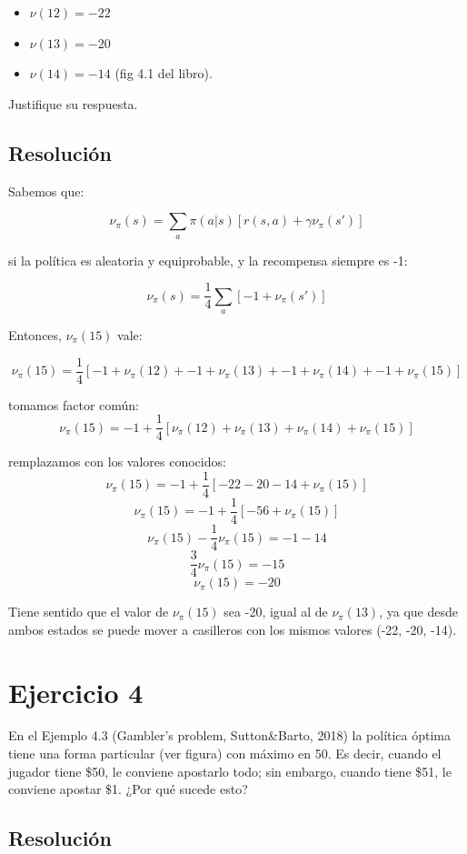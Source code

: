 \documentclass[12pt,a4paper]{article}
\begin{document}
\begin{itemize}

\item $\nu(12) = -22$
\item $\nu(13) = -20$
\item $\nu(14) = -14$ (fig 4.1 del libro).
\end{itemize}

Justifique su respuesta.

\subsection{Resolución}

Sabemos que:

$$ \nu_\pi(s) = \sum_a \pi(a|s) [r(s,a) + \gamma \nu_\pi(s')] $$

si la política es aleatoria y equiprobable, y la recompensa siempre es -1:

$$ \nu_\pi(s) = \frac{1}{4} \sum_a [-1 + \nu_\pi(s')] $$

Entonces, $\nu_\pi(15)$ vale:

$$ \nu_\pi(15) = \frac{1}{4} [ -1 + \nu_\pi(12) + -1 + \nu_\pi(13) + -1 + \nu_\pi(14) + -1 + \nu_\pi(15)] $$

tomamos factor común:
$$ \nu_\pi(15) = -1 + \frac{1}{4} [\nu_\pi(12) + \nu_\pi(13) + \nu_\pi(14) + \nu_\pi(15)] $$

remplazamos con los valores conocidos:
$$ \nu_\pi(15) = -1 + \frac{1}{4} [-22 - 20 - 14 + \nu_\pi(15)] $$
$$ \nu_\pi(15) = -1 + \frac{1}{4} [-56 + \nu_\pi(15)] $$
$$ \nu_\pi(15) - \frac{1}{4}\nu_\pi(15) = -1 - 14 $$
$$ \frac{3}{4}\nu_\pi(15) = -15 $$
$$ \nu_\pi(15) = -20 $$

Tiene sentido que el valor de $\nu_\pi(15)$ sea -20, igual al de
$\nu_\pi(13)$, ya que desde ambos estados se puede mover a
casilleros con los mismos valores (-22, -20, -14).

\section{Ejercicio 4}

En el Ejemplo 4.3 (Gambler's problem, Sutton\&Barto, 2018) la política óptima tiene una forma particular 
(ver figura) con máximo en 50. Es decir,  cuando  el  jugador  tiene \$50,  le  conviene apostarlo todo; 
sin embargo, cuando tiene \$51, le conviene apostar \$1. ¿Por qué sucede esto?

\subsection{Resolución}
\end{document}
